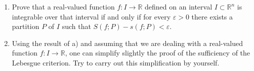 \documentclass{Math_Note}
\begin{document}
\begin{prb}
\begin{enumerate}
  \item [a)] Prove that a real-valued function $f : I \to \mathbb{R}$ defined on an interval $I \subset \mathbb{R}^n$ is integrable over that interval if and only if for every $\varepsilon > 0$ there exists a partition $P$ of $I$ such that $S(f; P) - s(f; P) < \varepsilon$.
  \item [b)] Using the result of a) and assuming that we are dealing with a real-valued function $f : I \to \mathbb{R}$, one can simplify slightly the proof of the sufficiency of the Lebesgue criterion. Try to carry out this simplification by yourself.
\end{enumerate}
\end{prb}
\end{document}
